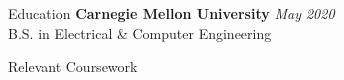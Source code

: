 \documentclass{resume} %
\begin{document}

\begin{Section}{Education}
{\bf Carnegie Mellon University} \hfill {\em May 2020} 
\\ B.S. in Electrical \& Computer Engineering\hfill %

\end{Section}

\begin{Section}{Relevant Coursework}


\end{Section}
\end{document}
